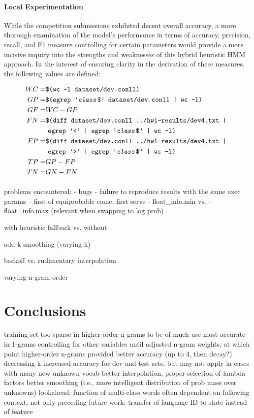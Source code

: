 \documentclass[11pt,a4paper]{article}
\begin{document}
\paragraph{Local Experimentation}
While the competition submissions exhibited decent overall accuracy,
a more thorough examination of the model's performance in
terms of accuracy, precision, recall, and F1 measure controlling
for certain parameters would provide a more incisive inquiry
into the strengths and weaknesses of this hybrid heuristic HMM approach.
In the interest of ensuring clarity in the derivation of these measures,
the following values are defined:

{\tiny
\begin{align*}{}
  WC =& \texttt{\$(wc -l dataset/dev.conll)} \\
  GP =& \texttt{\$(egrep '\emph{class}\$' dataset/dev.conll | wc -l)} \\
  GF =& WC - GP \\
  FN =& \texttt{\$(diff dataset/dev.conll ../hw1-results/dev4.txt | } \\
     &\  \texttt{egrep '<' | egrep '\emph{class}\$' | wc -l)} \\
  FP =& \texttt{\$(diff dataset/dev.conll ../hw1-results/dev4.txt | } \\
     &\  \texttt{egrep '>' | egrep '\emph{class}\$' | wc -l)} \\
  TP =& GP - FP \\
  TN =& GN - FN
\end{align*}}

\paragraph{}
problems encountered:
- bugs
- failure to reproduce results with the same exec params
-- first of equiprobable come, first serve
- float\_info.min vs. -float\_info.max (relevant when swapping to log prob)

with heuristic fallback vs. without

add-k smoothing (varying k)

backoff vs. rudimentary interpolation

varying n-gram order

\section{Conclusions}

training set too sparse in higher-order n-grams to be of much use
most accurate in 1-grams controlling for other variables until adjusted n-gram weights, at which point higher-order n-grams provided better accuracy (up to 4, then decay?)
decreasing k increased accuracy for dev and test sets, but may not apply in cases with many new unknown vocab
better interpolation, proper selection of lambda factors
better smoothing (i.e., more intelligent distribution of prob mass over unknowns)
lookahead: function of multi-class words often dependent on following context, not only preceding
future work: transfer of language ID to state instead of feature
\end{document}
